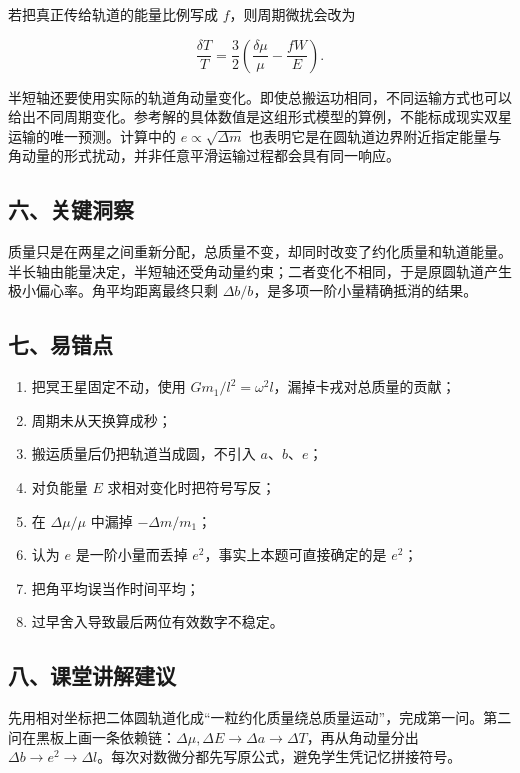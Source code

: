 \documentclass[12pt,a4paper,UTF8]{ctexart}
\newcommand{\tightlist}{\setlength{\itemsep}{0pt}\setlength{\parskip}{0pt}}
\begin{document}
若把真正传给轨道的能量比例写成 \(f\)，则周期微扰会改为

\[\frac{\delta T}{T}=\frac32\left(\frac{\delta\mu}{\mu}-\frac{fW}{E}\right).\]

半短轴还要使用实际的轨道角动量变化。即使总搬运功相同，不同运输方式也可以给出不同周期变化。参考解的具体数值是这组形式模型的算例，不能标成现实双星运输的唯一预测。计算中的
\(e\propto\sqrt{\Delta m}\)
也表明它是在圆轨道边界附近指定能量与角动量的形式扰动，并非任意平滑运输过程都会具有同一响应。

\subsection{六、关键洞察}\label{ux516dux5173ux952eux6d1eux5bdf-6}

质量只是在两星之间重新分配，总质量不变，却同时改变了约化质量和轨道能量。半长轴由能量决定，半短轴还受角动量约束；二者变化不相同，于是原圆轨道产生极小偏心率。角平均距离最终只剩
\(\Delta b/b\)，是多项一阶小量精确抵消的结果。

\subsection{七、易错点}\label{ux4e03ux6613ux9519ux70b9-6}

\begin{enumerate}
\def\labelenumi{\arabic{enumi}.}
\tightlist
\item
  把冥王星固定不动，使用
  \(Gm_1/l^2=\omega^2l\)，漏掉卡戎对总质量的贡献；
\item
  周期未从天换算成秒；
\item
  搬运质量后仍把轨道当成圆，不引入 \(a\)、\(b\)、\(e\)；
\item
  对负能量 \(E\) 求相对变化时把符号写反；
\item
  在 \(\Delta\mu/\mu\) 中漏掉 \(-\Delta m/m_1\)；
\item
  认为 \(e\) 是一阶小量而丢掉 \(e^2\)，事实上本题可直接确定的是
  \(e^2\)；
\item
  把角平均误当作时间平均；
\item
  过早舍入导致最后两位有效数字不稳定。
\end{enumerate}

\subsection{八、课堂讲解建议}\label{ux516bux8bfeux5802ux8bb2ux89e3ux5efaux8bae-6}

先用相对坐标把二体圆轨道化成``一粒约化质量绕总质量运动''，完成第一问。第二问在黑板上画一条依赖链：\(\Delta\mu,\Delta E\to\Delta a\to\Delta T\)，再从角动量分出
\(\Delta b\to e^2\to\Delta l\)。每次对数微分都先写原公式，避免学生凭记忆拼接符号。
\end{document}
